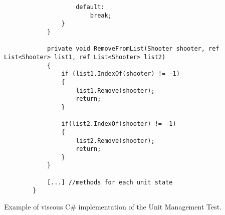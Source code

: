 \begin{listing}
\begin{verbatim}
                    default:
                        break;
                }
            }
        
            private void RemoveFromList(Shooter shooter, ref List<Shooter> list1, ref List<Shooter> list2)
            {
                if (list1.IndexOf(shooter) != -1)
                {
                    list1.Remove(shooter);
                    return;
                }
        
                if(list2.IndexOf(shooter) != -1)
                {
                    list2.Remove(shooter);
                    return;
                }
            }
        
            [...] //methods for each unit state
        }
    \end{verbatim}
    \caption{Example of viscous C\# implementation of the Unit Management Test.}
    \label{lst:csharp:viscous}
\end{listing}